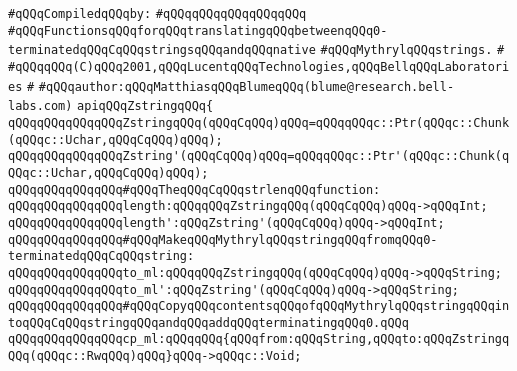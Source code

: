 \label{src/lib/c-glue-lib/zstring.api}
\newline
\verb|#qQQqCompiledqQQqby:|\newline
\verb|#qQQqqQQqqQQqqQQqqQQq|\newline
\newline
\verb|#qQQqFunctionsqQQqforqQQqtranslatingqQQqbetweenqQQq0-terminatedqQQqCqQQqstringsqQQqandqQQqnative|\newline
\verb|#qQQqMythrylqQQqstrings.|\newline
\verb|#|\newline
\verb|#qQQqqQQq(C)qQQq2001,qQQqLucentqQQqTechnologies,qQQqBellqQQqLaboratories|\newline
\verb|#|\newline
\verb|#qQQqauthor:qQQqMatthiasqQQqBlumeqQQq(blume@research.bell-labs.com)|\newline
\newline
\verb|apiqQQqZstringqQQq{|\newline
\newline
\verb|qQQqqQQqqQQqqQQqZstringqQQq(qQQqCqQQq)qQQq=qQQqqQQqc::Ptr(qQQqc::Chunk(qQQqc::Uchar,qQQqCqQQq)qQQq);|\newline
\verb|qQQqqQQqqQQqqQQqZstring'(qQQqCqQQq)qQQq=qQQqqQQqc::Ptr'(qQQqc::Chunk(qQQqc::Uchar,qQQqCqQQq)qQQq);|\newline
\newline
\verb|qQQqqQQqqQQqqQQq#qQQqTheqQQqCqQQqstrlenqQQqfunction:|\newline
\verb|qQQqqQQqqQQqqQQqlength:qQQqqQQqZstringqQQq(qQQqCqQQq)qQQq->qQQqInt;|\newline
\verb|qQQqqQQqqQQqqQQqlength':qQQqZstring'(qQQqCqQQq)qQQq->qQQqInt;|\newline
\newline
\verb|qQQqqQQqqQQqqQQq#qQQqMakeqQQqMythrylqQQqstringqQQqfromqQQq0-terminatedqQQqCqQQqstring:|\newline
\verb|qQQqqQQqqQQqqQQqto_ml:qQQqqQQqZstringqQQq(qQQqCqQQq)qQQq->qQQqString;|\newline
\verb|qQQqqQQqqQQqqQQqto_ml':qQQqZstring'(qQQqCqQQq)qQQq->qQQqString;|\newline
\newline
\verb|qQQqqQQqqQQqqQQq#qQQqCopyqQQqcontentsqQQqofqQQqMythrylqQQqstringqQQqintoqQQqCqQQqstringqQQqandqQQqaddqQQqterminatingqQQq0.qQQq|\newline
\verb|qQQqqQQqqQQqqQQqcp_ml:qQQqqQQq{qQQqfrom:qQQqString,qQQqto:qQQqZstringqQQq(qQQqc::RwqQQq)qQQq}qQQq->qQQqc::Void;|\newline
